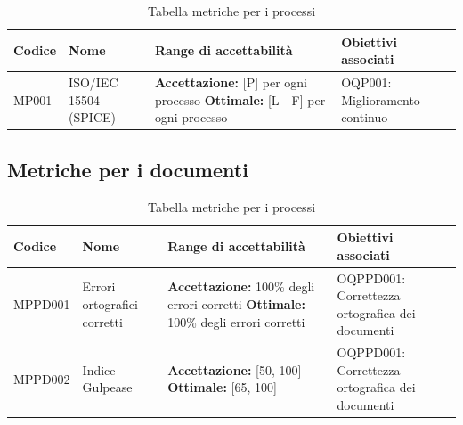 \documentclass[openany,12pt,a4paper]{report}
\begin{document}
	\begin{longtable}{| p{2cm} | p{3.5cm} |p{5.5cm} | p{5.5cm} |}
		\caption {Tabella metriche per i processi} \label{tab:title} \\
		\hline
		\textbf{Codice} & \textbf{Nome} & \textbf{Range di accettabilità} & \textbf{Obiettivi associati}\\
		\hline
		\endhead
		
		\newline MP001&
		\newline ISO/IEC 15504 (SPICE)&
		\newline \textbf{Accettazione:} [P] per ogni processo 
		\newline \textbf{Ottimale:} [L - F] per ogni processo&
		\newline OQP001: Miglioramento continuo
		\\[1em]
		
		\hline
	\end{longtable}
	
	
	\subsection{Metriche per i documenti}
	
	\begin{longtable}{| p{2cm} | p{3.5cm} |p{5.5cm} | p{5.5cm} |}
		\caption {Tabella metriche per i processi} \label{tab:title} \\
		\hline
		\textbf{Codice} & \textbf{Nome} & \textbf{Range di accettabilità} & \textbf{Obiettivi associati}\\
		\hline
		\endhead
		
		\newline MPPD001 &
		\newline Errori ortografici corretti &
		\newline \textbf{Accettazione:} 100\% degli errori corretti
		\newline \textbf{Ottimale:} 100\% degli errori corretti&
		\newline OQPPD001: Correttezza ortografica dei documenti
		\\[1em]
		
		\hline
		
		\newline MPPD002 &
		\newline Indice Gulpease &
		\newline \textbf{Accettazione:} [50, 100] 
		\newline \textbf{Ottimale:} [65, 100]&
		\newline OQPPD001: Correttezza ortografica dei documenti
		\\[1em]
		
		\hline
	\end{longtable}
\end{document}

